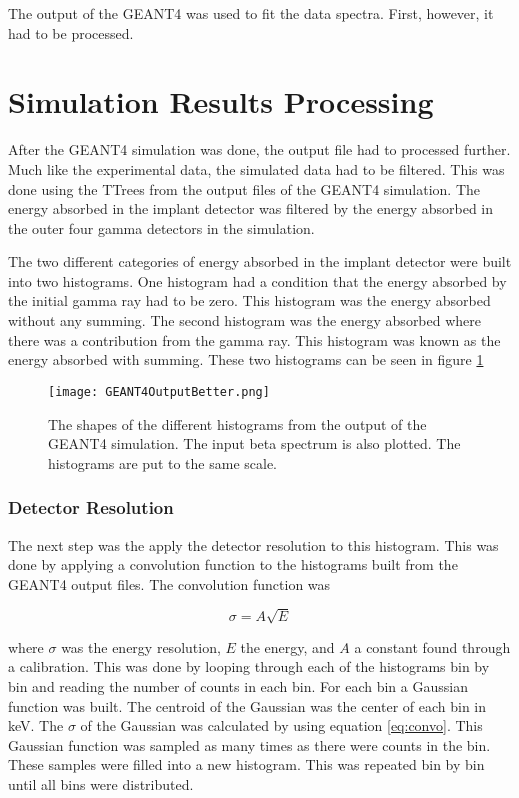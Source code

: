 

The output of the GEANT4 was used to fit the data spectra. 
First, however, it had to be processed. 

\section{Simulation Results Processing}
After the GEANT4 simulation was done, the output file had to processed further.  
Much like the experimental data, the simulated data had to be filtered.
This was done using the TTrees from the output files of the GEANT4 simulation.
The energy absorbed in the implant detector was filtered by the energy absorbed in the outer four gamma detectors in the simulation.

The two different categories of energy absorbed in the implant detector were built into two histograms. 
One histogram had a condition that the energy absorbed by the initial gamma ray had to be zero.
This histogram was the energy absorbed without any summing.
The second histogram was the energy absorbed where there was a contribution from the gamma ray.
This histogram was known as the energy absorbed with summing.
These two histograms can be seen in figure \ref{fig:GEANT4Hists}

\begin{figure}[!htb]
	\centerline{\texttt{[image: GEANT4OutputBetter.png]}}
	\caption{The shapes of the different histograms from the output of the GEANT4 simulation.
		 The input beta spectrum is also plotted.
		 The histograms are put to the same scale.}
	\label{fig:GEANT4Hists}
\end{figure}

\subsubsection{Detector Resolution}
\label{sec:convolution}
The next step was the apply the detector resolution to this histogram.
This was done by applying a convolution function to the histograms built from the GEANT4 output files.
The convolution function was

\begin{equation}
	\sigma = A\sqrt{E}
	\label{eq:convo}
\end{equation}

where $\sigma$ was the energy resolution, $E$ the energy, and $A$ a constant found through a calibration.
This was done by looping through each of the histograms bin by bin and reading the number of counts in each bin.
For each bin a Gaussian function was built.
The centroid of the Gaussian was the center of each bin in keV.
The $\sigma$ of the Gaussian was calculated by using equation \ref{eq:convo}.
This Gaussian function was sampled as many times as there were counts in the bin.
These samples were filled into a new histogram.
This was repeated bin by bin until all bins were distributed.

